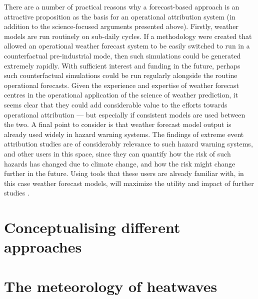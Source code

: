       There are a number of practical reasons why a forecast-based approach is an attractive proposition as the basis for an operational attribution system (in addition to the science-focused arguments presented above). Firstly, weather models are run routinely on sub-daily cycles. If a methodology were created that allowed an operational weather forecast system to be easily switched to run in a counterfactual pre-industrial mode, then such simulations could be generated extremely rapidly. With sufficient interest and funding in the future, perhaps such counterfactual simulations could be run regularly alongside the routine operational forecasts. Given the experience and expertise of weather forecast centres in the operational application of the science of weather prediction, it seems clear that they could add considerable value to the efforts towards operational attribution \citep{wehner_operational_2022} --- but especially if consistent models are used between the two. A final point to consider is that weather forecast model output is already used widely in hazard warning systems. The findings of extreme event attribution studies are of considerably relevance to such hazard warning systems, and other users in this space, since they can quantify how the risk of such hazards has changed due to climate change, and how the risk might change further in the future. Using tools that these users are already familiar with, in this case weather forecast models, will maximize the utility and impact of further studies \citep{schaller_role_2020}.

\section{Conceptualising different approaches}

  \blindtext

\section{The meteorology of heatwaves}

